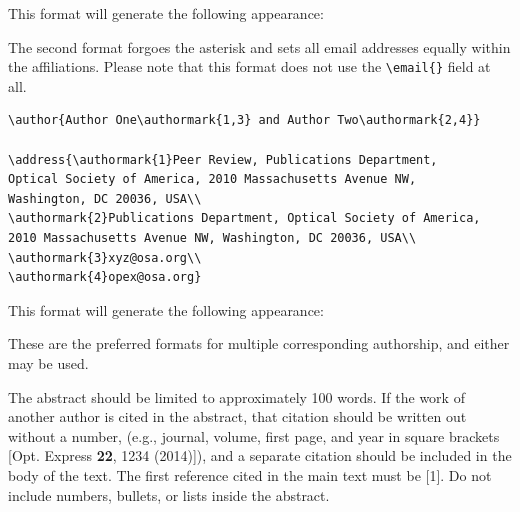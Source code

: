\documentclass{osa-article}
\begin{document}
This format will generate the following appearance:

\medskip

\author{Author One and Author Two}

\address{Peer Review, Publications Department,
Optical Society of America, 2010 Massachusetts Avenue NW,
Washington, DC 20036, USA\\
Publications Department, Optical Society of America,
2010 Massachusetts Avenue NW, Washington, DC 20036, USA\\
xyz@osa.org}


\medskip

The second format forgoes the asterisk and sets all email addresses equally within the affiliations. Please note that this format does not use the \verb+\email{}+ field at all.
\begin{verbatim}
\author{Author One\authormark{1,3} and Author Two\authormark{2,4}}

\address{\authormark{1}Peer Review, Publications Department,
Optical Society of America, 2010 Massachusetts Avenue NW,
Washington, DC 20036, USA\\
\authormark{2}Publications Department, Optical Society of America,
2010 Massachusetts Avenue NW, Washington, DC 20036, USA\\
\authormark{3}xyz@osa.org\\
\authormark{4}opex@osa.org}
\end{verbatim}

This format will generate the following appearance:

\medskip

\author{Author One and Author Two}

\address{Peer Review, Publications Department,
Optical Society of America, 2010 Massachusetts Avenue NW, Washington, DC 20036, USA\\
Publications Department, Optical Society of America, 2010 Massachusetts Avenue NW, Washington, DC 20036, USA\\
xyz@osa.org\\
opex@osa.org}
\medskip
These are the preferred
formats for multiple corresponding authorship, and either may be used.


The abstract should be limited to approximately 100 words.
If the work of another author is cited in the abstract, that citation should be written out without a number, (e.g., journal, volume, first page, and year in square brackets [Opt. Express {\bfseries 22}, 1234 (2014)]), and a separate citation should be included in the body of the text. The first reference cited in the main text must be [1]. Do not include numbers, bullets, or lists inside the abstract.
\end{document}
